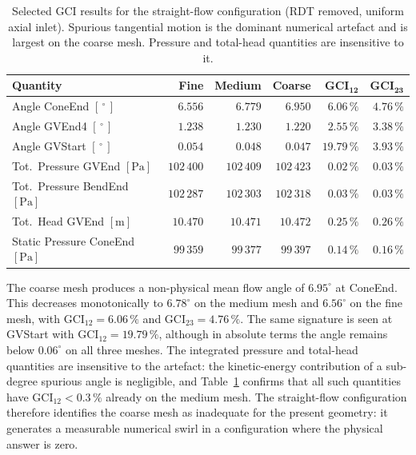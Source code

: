 \begin{table}[h!]
  \centering
  \caption[GCI -- straight-flow configuration]{Selected GCI results for the straight-flow configuration (RDT removed, uniform axial inlet). Spurious tangential motion is the dominant numerical artefact and is largest on the coarse mesh. Pressure and total-head quantities are insensitive to it.}
  \label{tab:gci_straight_keep}
  \small
  \begin{tabular}{l r r r r r}
    \toprule
    \textbf{Quantity}                            & \textbf{Fine} & \textbf{Medium} & \textbf{Coarse} & $\mathbf{GCI_{12}}$ & $\mathbf{GCI_{23}}$ \\
    \midrule
    Angle ConeEnd  $[\,^\circ\,]$                & $6.556$       & $6.779$         & $6.950$         & $6.06\,\%$  & $4.76\,\%$  \\
    Angle GVEnd4   $[\,^\circ\,]$                & $1.238$       & $1.230$         & $1.220$         & $2.55\,\%$  & $3.38\,\%$  \\
    Angle GVStart  $[\,^\circ\,]$                & $0.054$       & $0.048$         & $0.047$         & $19.79\,\%$ & $3.93\,\%$  \\
    \midrule
    Tot.\ Pressure GVEnd     $[\mathrm{Pa}]$     & $102\,400$    & $102\,409$      & $102\,423$      & $0.02\,\%$  & $0.03\,\%$  \\
    Tot.\ Pressure BendEnd   $[\mathrm{Pa}]$     & $102\,287$    & $102\,303$      & $102\,318$      & $0.03\,\%$  & $0.03\,\%$  \\
    Tot.\ Head GVEnd $[\mathrm{m}]$              & $10.470$      & $10.471$        & $10.472$        & $0.25\,\%$  & $0.26\,\%$  \\
    Static Pressure ConeEnd $[\mathrm{Pa}]$      & $99\,359$     & $99\,377$       & $99\,397$       & $0.14\,\%$  & $0.16\,\%$  \\
    \bottomrule
  \end{tabular}
\end{table}

The coarse mesh produces a non-physical mean flow angle of $6.95^\circ$ at ConeEnd. This decreases monotonically to $6.78^\circ$ on the medium mesh and $6.56^\circ$ on the fine mesh, with $\mathrm{GCI}_{12} = 6.06\,\%$ and $\mathrm{GCI}_{23} = 4.76\,\%$. The same signature is seen at GVStart with $\mathrm{GCI}_{12} = 19.79\,\%$, although in absolute terms the angle remains below $0.06^\circ$ on all three meshes. The integrated pressure and total-head quantities are insensitive to the artefact: the kinetic-energy contribution of a sub-degree spurious angle is negligible, and Table~\ref{tab:gci_straight_keep} confirms that all such quantities have $\mathrm{GCI}_{12} < 0.3\,\%$ already on the medium mesh. The straight-flow configuration therefore identifies the coarse mesh as inadequate for the present geometry: it generates a measurable numerical swirl in a configuration where the physical answer is zero.

